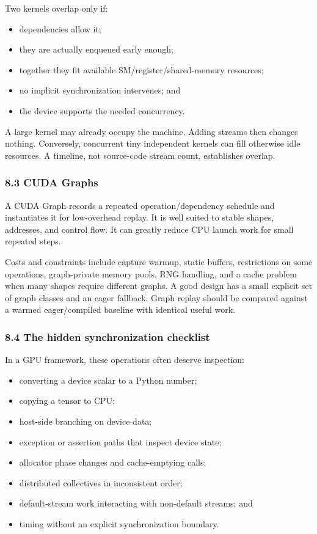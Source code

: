\documentclass[
  10pt,
  letterpaper,
]{article}
\providecommand{\tightlist}{%
  \setlength{\itemsep}{0pt}\setlength{\parskip}{0pt}}
\begin{document}
Two kernels overlap only if:

\begin{itemize}
\tightlist
\item
  dependencies allow it;
\item
  they are actually enqueued early enough;
\item
  together they fit available SM/register/shared-memory resources;
\item
  no implicit synchronization intervenes; and
\item
  the device supports the needed concurrency.
\end{itemize}

A large kernel may already occupy the machine. Adding streams then
changes nothing. Conversely, concurrent tiny independent kernels can
fill otherwise idle resources. A timeline, not source-code stream count,
establishes overlap.

\subsubsection{8.3 CUDA Graphs}\label{83-cuda-graphs}

A CUDA Graph records a repeated operation/dependency schedule and
instantiates it for low-overhead replay. It is well suited to stable
shapes, addresses, and control flow. It can greatly reduce CPU launch
work for small repeated steps.

Costs and constraints include capture warmup, static buffers,
restrictions on some operations, graph-private memory pools, RNG
handling, and a cache problem when many shapes require different graphs.
A good design has a small explicit set of graph classes and an eager
fallback. Graph replay should be compared against a warmed
eager/compiled baseline with identical useful work.

\subsubsection{8.4 The hidden synchronization
checklist}\label{84-the-hidden-synchronization-checklist}

In a GPU framework, these operations often deserve inspection:

\begin{itemize}
\tightlist
\item
  converting a device scalar to a Python number;
\item
  copying a tensor to CPU;
\item
  host-side branching on device data;
\item
  exception or assertion paths that inspect device state;
\item
  allocator phase changes and cache-emptying calls;
\item
  distributed collectives in inconsistent order;
\item
  default-stream work interacting with non-default streams; and
\item
  timing without an explicit synchronization boundary.
\end{itemize}
\end{document}
